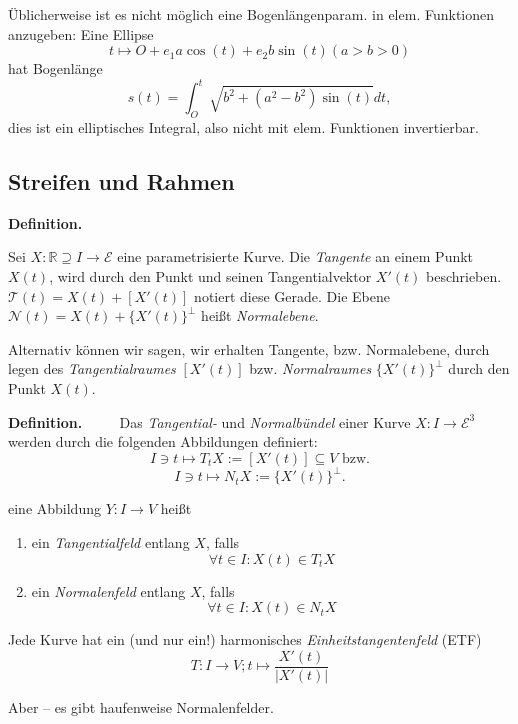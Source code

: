 \documentclass[a4paper,oneside,11pt,DIV=12,parskip=half]{scrartcl}
\newcommand{\R}{\mathbb R}
\newcommand{\E}{\mathcal E}
\newenvironment{definition}{\textbf{Definition.} ~~~~}{}
\newenvironment{lemma, definition}{\textbf{Lemma und Definition.} ~~~~}{}
\newenvironment{note, example}{\textbf{Bemerkung und Beispiel.} ~~~~}{}
\newenvironment{note, definition}{\textbf{Bemerkung und Definition.} ~~~~}{}
\begin{document}
\begin{note, example}
	
	Üblicherweise ist es nicht möglich eine Bogenlängenparam. in elem. Funktionen anzugeben: Eine Ellipse\[t \mapsto O + e_1a\cos(t)+e_2b\sin(t) (a>b>0)\]
	hat Bogenlänge
	\[s(t) = \int_{O}^{t} \sqrt{b^2 + ( a^2-b^2)\sin(t)}dt,\]
	dies ist ein elliptisches Integral, also nicht mit elem. Funktionen invertierbar.

\end{note, example}

\subsection{Streifen und Rahmen}

\begin{definition}
	
	Sei $X: \R \supseteq I \rightarrow \E$ eine parametrisierte Kurve.
	Die \textit{Tangente} an einem Punkt $X(t)$, wird durch den Punkt und seinen Tangentialvektor $X'(t)$ beschrieben. $\mathcal{T}(t)=X(t) + [X'(t)]$ notiert diese Gerade.
	Die Ebene $\mathcal{N}(t)=X(t)+ \{X'(t)\}^\perp $ heißt \textit{Normalebene}.
	
	Alternativ können wir sagen, wir erhalten Tangente, bzw. Normalebene, durch legen des \textit{Tangentialraumes} $[X'(t)]$ bzw. \textit{Normalraumes} $\{X'(t)\}^\perp$ durch den Punkt $X(t)$.
	
\end{definition}

\begin{definition}
	Das \textit{Tangential-} und \textit{Normalbündel} einer Kurve $X:I \rightarrow \E^3$ werden durch die folgenden Abbildungen definiert:
	\[I \ni t \mapsto T_tX := [X'(t)]\subseteq V \text{ bzw.}\]
	\[I \ni t \mapsto N_tX:= \{ X'(t) \}^\perp. \]
	
	eine Abbildung $Y: I \rightarrow V$ heißt
	\begin{enumerate}
		\item ein \textit{Tangentialfeld} entlang $X$, falls \[ \forall t \in I: X(t) \in T_tX \]
		\item ein \textit{Normalenfeld} entlang $X$, falls \[  \forall t \in I: X(t) \in N_tX \]
	\end{enumerate}
\end{definition}

\begin{note, definition}

Jede Kurve hat ein (und nur ein!) harmonisches \textit{Einheitstangentenfeld} (ETF)
\[ T: I \rightarrow V; t \mapsto \frac{X'(t)}{|X'(t)|} \]

Aber -- es gibt haufenweise Normalenfelder.

\end{note, definition}
\end{document}
